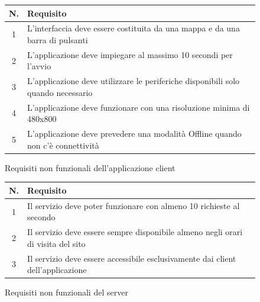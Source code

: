 \begin{figure}[h!]
\begin{center}
\begin{tabular}[c]{|c|p{10cm}|}
\hline
N. & Requisito\\ \hline
1 & L'interfaccia deve essere costituita da una mappa e da una barra di pulsanti\\ \hline
2 & L'applicazione deve impiegare al massimo 10 secondi per l'avvio\\ \hline
3 & L'applicazione deve utilizzare le periferiche disponibili solo quando necessario\\ \hline
4 & L'applicazione deve funzionare con una risoluzione minima di 480x800\\ \hline
5 & L'applicazione deve prevedere una modalità Offline quando non c'è connettività\\ \hline
\end{tabular}
\caption{Requisiti non funzionali dell'applicazione client\label{nfrclient}}
\end{center}
\end{figure}
\begin{figure}[h!]
\begin{center}
\begin{tabular}[c]{|c|p{9cm}|}
\hline
N. & Requisito\\ \hline
1 & Il servizio deve poter funzionare con almeno 10 richieste al secondo\\ \hline
2 & Il servizio deve essere sempre disponibile almeno negli orari di visita del sito\\ \hline
3 & Il servizio deve essere accessibile esclusivamente dai client dell'applicazione\\ \hline
\end{tabular}
\caption{Requisiti non funzionali del server\label{nfrserver}}
\end{center}
\end{figure}


